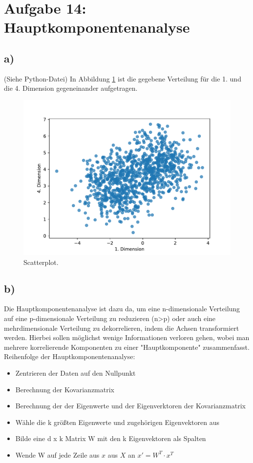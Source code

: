 \section{Aufgabe 14: Hauptkomponentenanalyse}
\subsection{a)}
(Siehe Python-Datei) In Abbildung \ref{abb:1} ist die gegebene Verteilung
für die 1. und die 4. Dimension gegeneinander aufgetragen.
\begin{figure}
  \centering
  \includegraphics[scale=0.7]{Aufgabe14/Scatterplot.pdf}
  \caption{Scatterplot.}
  \label{abb:1}
\end{figure}


\subsection{b)}
Die Hauptkomponentenanalyse ist dazu da, um eine n-dimensionale Verteilung
auf eine p-dimensionale Verteilung zu reduzieren (n>p) oder auch eine mehrdimensionale
Verteilung zu dekorrelieren, indem die Achsen transformiert werden. Hierbei sollen
möglichst wenige Informationen verloren gehen, wobei man mehrere korrelierende
Komponenten zu einer "Hauptkomponente" zusammenfasst.
Reihenfolge der Hauptkomponentenanalyse:
\begin{itemize}
  \item Zentrieren der Daten auf den Nullpunkt
  \item Berechnung der Kovarianzmatrix
  \item Berechnung der der Eigenwerte und der Eigenverktoren der Kovarianzmatrix
  \item Wähle die k größten Eigenwerte und zugehörigen Eigenvektoren aus
  \item Bilde eine d x k Matrix W mit den k Eigenvektoren als Spalten
  \item Wende W auf jede Zeile aus $x$ aus $X$ an $x' = W^T \cdot x^T$
\end{itemize}

